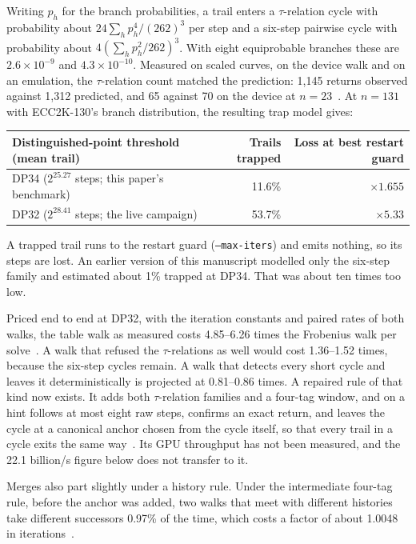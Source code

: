 \documentclass[11pt,a4paper]{article}
\newcommand{\code}[1]{\texttt{\small #1}}
\begin{document}
Writing $p_h$ for the branch probabilities, a trail enters a $\tau$-relation cycle with probability about $24\sum_hp_h^4/(262)^3$ per step and a six-step pairwise cycle with probability about $4(\sum_hp_h^2/262)^3$. With eight equiprobable branches these are $2.6\times10^{-9}$ and $4.3\times10^{-10}$. Measured on scaled curves, on the device walk and on an emulation, the $\tau$-relation count matched the prediction: 1,145 returns observed against 1,312 predicted, and 65 against 70 on the device at $n=23$~\cite{walkconstant}. At $n=131$ with ECC2K-130's branch distribution, the resulting trap model gives:
\begin{center}\small
\begin{tabular}{@{}lrr@{}}
\toprule
Distinguished-point threshold (mean trail) & Trails trapped & Loss at best restart guard\\
\midrule
DP34 ($2^{25.27}$ steps; this paper's benchmark) & 11.6\% & $\times1.655$\\
DP32 ($2^{28.41}$ steps; the live campaign) & 53.7\% & $\times5.33$\\
\bottomrule
\end{tabular}
\end{center}
A trapped trail runs to the restart guard (\code{--max-iters}) and emits nothing, so its steps are lost. An earlier version of this manuscript modelled only the six-step family and estimated about 1\% trapped at DP34. That was about ten times too low.

Priced end to end at DP32, with the iteration constants and paired rates of both walks, the table walk as measured costs 4.85--6.26 times the Frobenius walk per solve~\cite{walkconstant}. A walk that refused the $\tau$-relations as well would cost 1.36--1.52 times, because the six-step cycles remain. A walk that detects every short cycle and leaves it deterministically is projected at 0.81--0.86 times. A repaired rule of that kind now exists. It adds both $\tau$-relation families and a four-tag window, and on a hint follows at most eight raw steps, confirms an exact return, and leaves the cycle at a canonical anchor chosen from the cycle itself, so that every trail in a cycle exits the same way~\cite{cycleescape}. Its GPU throughput has not been measured, and the 22.1 billion/s figure below does not transfer to it.

Merges also part slightly under a history rule. Under the intermediate four-tag rule, before the anchor was added, two walks that meet with different histories take different successors 0.97\% of the time, which costs a factor of about 1.0048 in iterations~\cite{walkconstant}.
\end{document}
